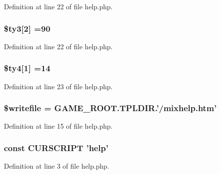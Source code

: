 Definition at line 22 of file help.\+php.

\hypertarget{help_8php_a3ebbddd85765b13f189184dda9c40694}{
\subsubsection[{\$ty3}]{\setlength{\rightskip}{0pt plus 5cm}\$ty3\mbox{[}2\mbox{]} =90}}\label{help_8php_a3ebbddd85765b13f189184dda9c40694}


Definition at line 22 of file help.\+php.

\hypertarget{help_8php_ad9c88705cd45e48b65d5c2aa4d6d54be}{
\subsubsection[{\$ty4}]{\setlength{\rightskip}{0pt plus 5cm}\$ty4\mbox{[}1\mbox{]} =14}}\label{help_8php_ad9c88705cd45e48b65d5c2aa4d6d54be}


Definition at line 23 of file help.\+php.

\hypertarget{help_8php_a7f36146362433df71ca7f7102705501a}{
\subsubsection[{\$writefile}]{\setlength{\rightskip}{0pt plus 5cm}\$writefile = G\+A\+M\+E\+\_\+\+R\+O\+O\+T.\+T\+P\+L\+D\+I\+R.'/mixhelp.\+htm'}}\label{help_8php_a7f36146362433df71ca7f7102705501a}


Definition at line 15 of file help.\+php.

\hypertarget{help_8php_a39c39f525eceb86cabc338804f230e80}{
\subsubsection[{C\+U\+R\+S\+C\+R\+I\+P\+T}]{\setlength{\rightskip}{0pt plus 5cm}const C\+U\+R\+S\+C\+R\+I\+P\+T 'help'}}\label{help_8php_a39c39f525eceb86cabc338804f230e80}


Definition at line 3 of file help.\+php.

